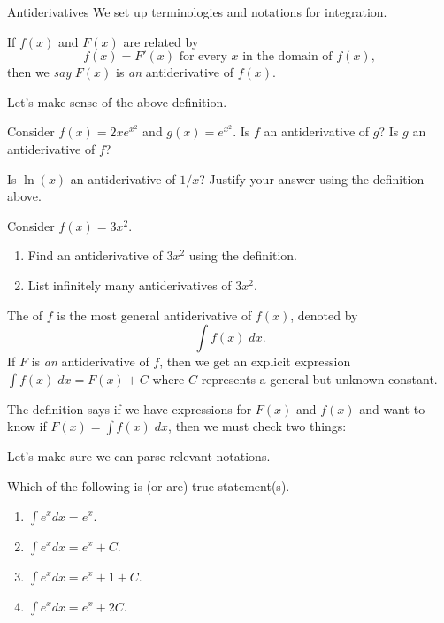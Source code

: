 \documentclass[../main.tex]{subfiles}
\begin{document}
\begin{lesson}{Antiderivatives}
  We set up terminologies and notations for integration.

  \begin{mdframed}[style=withref-compact]
    If \(f(x)\) and \(F(x)\) are related by
    \[
      f(x) = F'(x) \text{ for every } x \text{ in the domain of } f(x),
    \]
    then we \emph{say} \(F(x)\) is \emph{an} antiderivative of \(f(x)\).
  \end{mdframed}

  Let's make sense of the above definition.
  \begin{example}
    Consider \(f(x) = 2xe^{x^{2}}\) and \(g(x) = e^{x^{2}}\). Is \(f\) an antiderivative of \(g\)? Is \(g\) an antiderivative of \(f\)?
  \end{example}

  \begin{example}
    Is \(\ln(x)\) an antiderivative of \(1/x\)? Justify your answer using the definition above.

  \end{example}

  \begin{example}
    Consider \(f(x) = 3x^{2}\).

    \begin{enumerate}
      \item Find an antiderivative of \(3x^{2}\) using the definition.
      \item List infinitely many antiderivatives of \(3x^{2}\).
    \end{enumerate}
  \end{example}
  \clearpage

  \begin{mdframed}[style=withref-compact]
    The  of \(f\) is the most general antiderivative of \(f(x)\), denoted by 
    \[
      \int f(x) \;dx.
    \]
    If \(F\) is \emph{an} antiderivative of \(f\), then we get an explicit expression \(\int f(x) \;dx = F(x) + C\) where \(C\) represents a general but unknown constant.

  \end{mdframed}
  The definition says if we have expressions for \(F(x)\) and \(f(x)\) and want to know if \(F(x) = \int f(x) \;dx\), then we must check two things:

  Let's make sure we can parse relevant notations. 
  \begin{example}
    Which of the following is (or are) true statement(s).
    \begin{enumerate}[label=(\alph*)]
      \item \(\int e^{x} dx = e^{x}\).
      \item \(\int e^{x} dx = e^{x} + C\).
      \item \(\int e^{x} dx = e^{x} + 1 + C\).
      \item \(\int e^{x} dx = e^{x} + 2C\).
    \end{enumerate}
  \end{example}


\end{lesson}
\end{document}

